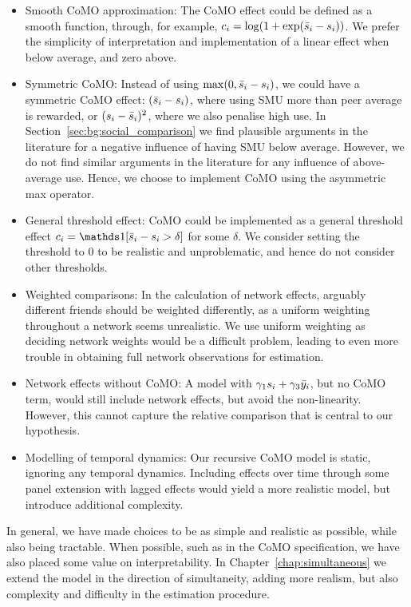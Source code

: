 \begin{itemize}
    \item Smooth CoMO approximation: The CoMO effect could be defined as a smooth function, through, for example, $c_i = \log(1 + \exp(\bar{s}_i - s_i))$. We prefer the simplicity of interpretation and implementation of a linear effect when below average, and zero above.
    \item Symmetric CoMO: Instead of using $\max(0, \bar{s}_i - s_i)$, we could have a symmetric CoMO effect: $(\bar{s}_i - s_i)$, where using SMU more than peer average is rewarded, or $(s_i - \bar{s}_i)^2$, where we also penalise high use. In Section~\ref{sec:bg:social_comparison} we find plausible arguments in the literature for a negative influence of having SMU below average. However, we do not find similar arguments in the literature for any influence of above-average use. Hence, we choose to implement CoMO using the asymmetric max operator.
    \item General threshold effect: CoMO could be implemented as a general threshold effect $c_i = \one[\sbar_i - s_i > \delta]$ for some $\delta$. We consider setting the threshold to $0$ to be realistic and unproblematic, and hence do not consider other thresholds.
    \item Weighted comparisons: In the calculation of network effects, arguably different friends should be weighted differently, as a uniform weighting throughout a network seems unrealistic. We use uniform weighting as deciding network weights would be a difficult problem, leading to even more trouble in obtaining full network observations for estimation.
    \item Network effects without CoMO: A model with $\gamma_1 s_i + \gamma_3\bar{y}_i$, but no CoMO term, would still include network effects, but avoid the non-linearity. However, this cannot capture the relative comparison that is central to our hypothesis.
    \item Modelling of temporal dynamics: Our recursive CoMO model is static, ignoring any temporal dynamics. Including effects over time through some panel extension with lagged effects would yield a more realistic model, but introduce additional complexity.
\end{itemize}

In general, we have made choices to be as simple and realistic as possible, while also being tractable. When possible, such as in the CoMO specification, we have also placed some value on interpretability. In Chapter~\ref{chap:simultaneous} we extend the model in the direction of simultaneity, adding more realism, but also complexity and difficulty in the estimation procedure.

